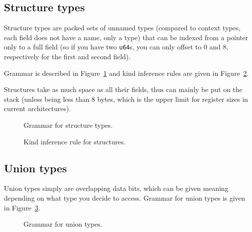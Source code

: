\subsection{Structure types}\label{subsec:nstar-common-ts-structs}

Structure types are packed sets of unnamed types (compared to context types, each field does not have a name, only a type) that can be indexed from a pointer only to a full field (so if you have two \texttt{u64}s, you can only offset to $0$ and $8$, respectively for the first and second field).

Grammar is described in Figure~\ref{fig:nstar-common-ts-structs-syntax} and kind inference rules are given in Figure~\ref{fig:nstar-common-ts-structs-kindrules}.

Structures take as much space as all their fields, thus can mainly be put on the stack (unless being less than 8 bytes, which is the upper limit for register sizes in current architectures).

\begin{figure}[htb]
  \centering

  \caption{Grammar for structure types.}
  \label{fig:nstar-common-ts-structs-syntax}
\end{figure}

\begin{figure}[htb]
  \centering
  \begin{prooftree}
  \end{prooftree}

  \caption{Kind inference rule for structures.}
  \label{fig:nstar-common-ts-structs-kindrules}
\end{figure}

\subsection{Union types}\label{subsec:nstar-common-ts-unions}

Union types simply are overlapping data bits, which can be given meaning depending on what type you decide to access.
Grammar for union types is given in Figure~\ref{fig:nstar-common-ts-unions-syntax}.

\begin{figure}[htb]
  \centering

  \caption{Grammar for union types.}
  \label{fig:nstar-common-ts-unions-syntax}
\end{figure}

